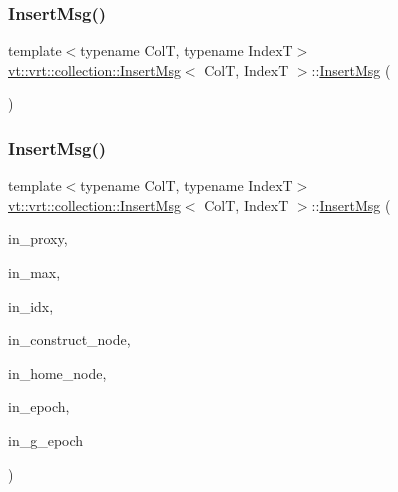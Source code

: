 \subsubsection{\texorpdfstring{Insert\+Msg()}{InsertMsg()}\hspace{0.1cm}{\footnotesize\ttfamily [1/2]}}
{\footnotesize\ttfamily template$<$typename ColT, typename IndexT$>$ \\
\hyperlink{structvt_1_1vrt_1_1collection_1_1_insert_msg}{vt\+::vrt\+::collection\+::\+Insert\+Msg}$<$ ColT, IndexT $>$\+::\hyperlink{structvt_1_1vrt_1_1collection_1_1_insert_msg}{Insert\+Msg} (\begin{DoxyParamCaption}{ }\end{DoxyParamCaption})\hspace{0.3cm}{\ttfamily [default]}}

\mbox{\label{structvt_1_1vrt_1_1collection_1_1_insert_msg_a56b81ce822e935c00a7419734844d288}} 
\subsubsection{\texorpdfstring{Insert\+Msg()}{InsertMsg()}\hspace{0.1cm}{\footnotesize\ttfamily [2/2]}}
{\footnotesize\ttfamily template$<$typename ColT, typename IndexT$>$ \\
\hyperlink{structvt_1_1vrt_1_1collection_1_1_insert_msg}{vt\+::vrt\+::collection\+::\+Insert\+Msg}$<$ ColT, IndexT $>$\+::\hyperlink{structvt_1_1vrt_1_1collection_1_1_insert_msg}{Insert\+Msg} (\begin{DoxyParamCaption}\item[{\hyperlink{structvt_1_1vrt_1_1collection_1_1_collection_proxy}{Collection\+Proxy}$<$ ColT, IndexT $>$}]{in\+\_\+proxy,  }\item[{IndexT}]{in\+\_\+max,  }\item[{IndexT}]{in\+\_\+idx,  }\item[{\hyperlink{namespacevt_a866da9d0efc19c0a1ce79e9e492f47e2}{Node\+Type}}]{in\+\_\+construct\+\_\+node,  }\item[{\hyperlink{namespacevt_a866da9d0efc19c0a1ce79e9e492f47e2}{Node\+Type}}]{in\+\_\+home\+\_\+node,  }\item[{\hyperlink{namespacevt_a985a5adf291c34a3ca263b3378388236}{Epoch\+Type}}]{in\+\_\+epoch,  }\item[{\hyperlink{namespacevt_a985a5adf291c34a3ca263b3378388236}{Epoch\+Type}}]{in\+\_\+g\+\_\+epoch }\end{DoxyParamCaption})\hspace{0.3cm}{\ttfamily [inline]}}



